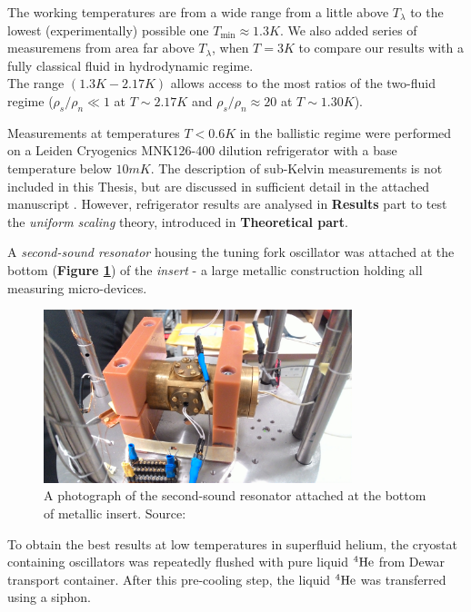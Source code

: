 \newpage

The working temperatures are from a wide range from a little above $T_{\lambda}$ to the lowest (experimentally) possible one $T_{\text{min}} \approx 1.3\unit{K}$. We also added series of measuremens from area far above $T_{\lambda}$, when $T = 3\unit{K}$ to compare our results with a fully classical fluid in hydrodynamic regime.\\
The range $(1.3\unit{K} - 2.17\unit{K})$ allows access to the most ratios of the two-fluid regime ($\rho_s / \rho_n \ll 1$ at $T\sim 2.17\unit{K}$ and $\rho_s / \rho_n \approx 20$ at $T\sim 1.30\unit{K}$).

Measurements at temperatures $T < 0.6\unit{K}$ in the ballistic regime were performed on a Leiden Cryogenics MNK126-400 dilution refrigerator with a base temperature below $10 \unit{mK}$. The description of sub-Kelvin measurements is not included in this Thesis, but are discussed in sufficient detail in the attached manuscript \cite{universal_scaling}. However, refrigerator results are analysed in \textbf{Results} part to test the \textit{uniform scaling} theory, introduced in \textbf{Theoretical part}.

A \textit{second-sound resonator} housing the tuning fork oscillator was attached at the bottom (\textbf{Figure \ref{resonator}}) of the \textit{insert} - a large metallic construction holding all measuring micro-devices.

\begin{figure}[h]
	\centering
	\includegraphics[width=0.8\textwidth]{graphics/exp/chamber}
	\caption{A photograph of the second-sound resonator attached at the bottom of metallic insert. Source: \cite{bakalaris}}
	\label{resonator}
\end{figure}

To obtain the best results at low temperatures in superfluid helium, the cryostat containing oscillators was repeatedly flushed with pure liquid ${}^4\mathrm{He}$ from Dewar transport container. After this pre-cooling step, the liquid ${}^4\mathrm{He}$ was transferred using a siphon.

